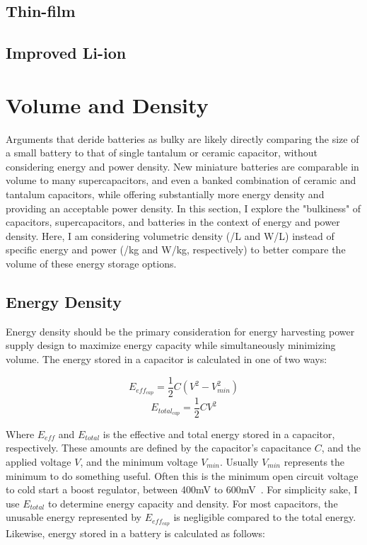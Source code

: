 \subsection{Thin-film}
\subsection{Improved Li-ion}

\section{Volume and Density}
Arguments that deride batteries as bulky are likely directly comparing the size of a small battery to that of single tantalum or ceramic capacitor, without considering energy and power density. New miniature batteries are comparable in volume to many supercapacitors, and even a banked combination of ceramic and tantalum capacitors, while offering substantially more energy density and providing an acceptable power density. In this section, I explore the "bulkiness" of capacitors, supercapacitors, and batteries in the context of energy and power density. Here, I am considering volumetric density (\si[per-mode=symbol]{\Wh\per\liter}  and  \si[per-mode=symbol]{\watt\per\liter}) instead of specific energy and power (\si[per-mode=symbol]{\Wh\per\kilo\gram} and  \si[per-mode=symbol]{\watt\per\kilo\gram}, respectively) to better compare the volume of these energy storage options.

\subsection{Energy Density}
Energy density should be the primary consideration for energy harvesting power supply design to maximize energy capacity while simultaneously minimizing volume. 
The energy stored in a capacitor is calculated in one of two ways:

$$E_{eff_{cap}} = \frac{1}{2} C (V^2 - V_{min}^2)$$
$$E_{total_{cap}} = \frac{1}{2} C V^2$$

Where $E_{eff}$ and $E_{total}$ is the effective and total energy stored in a capacitor, respectively. These amounts are defined by the capacitor's capacitance $C$, and the applied voltage $V$, and the minimum voltage $V_{min}$. Usually $V_{min}$ represents the minimum to do something useful. Often this is the minimum open circuit voltage to cold start a boost regulator, between 400\si{\milli\volt} to 600\si{\milli\volt}~\cite{adp5091,bq25505,max17222}. 
For simplicity sake, I use $E_{total}$ to determine energy capacity and density. For most capacitors, the unusable energy represented by $E_{eff_{cap}}$ is negligible compared to the total energy. Likewise, energy stored in a battery is calculated as follows:

